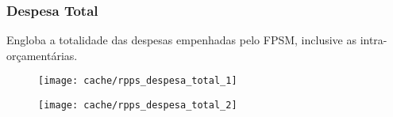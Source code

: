 
\subsubsection{Despesa Total}

Engloba a totalidade das despesas empenhadas pelo FPSM, inclusive as intra-orçamentárias.





\begin{figure}[H]
\center
\texttt{[image: cache/rpps\_despesa\_total\_1]}
\end{figure}

\begin{figure}[H]
\center
\texttt{[image: cache/rpps\_despesa\_total\_2]}
\end{figure}

